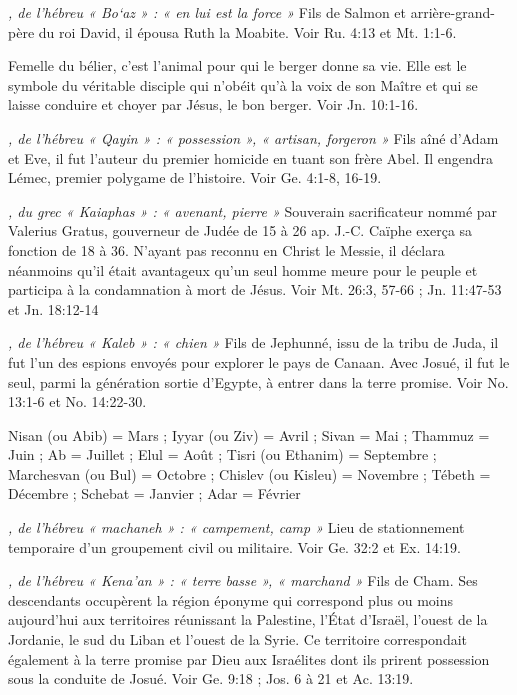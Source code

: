 \begin{multicols}{2}
\textit{, de l'hébreu « Bo`az » : « en lui est la force »}\newline
Fils de Salmon et arrière-grand-père du roi David, il épousa Ruth la Moabite. Voir Ru. 4:13 et Mt. 1:1-6.

\textit{}\newline
Femelle du bélier, c'est l'animal pour qui le berger donne sa vie. Elle est le symbole du véritable disciple qui n'obéit qu'à la voix de son Maître et qui se laisse conduire et choyer par Jésus, le bon berger. Voir Jn. 10:1-16.

\textit{, de l'hébreu « Qayin » : « possession », « artisan, forgeron »}\newline
Fils aîné d'Adam et Eve, il fut l'auteur du premier homicide en tuant son frère Abel. Il engendra Lémec, premier polygame de l'histoire. Voir Ge. 4:1-8, 16-19.

\textit{, du grec « Kaiaphas » : « avenant, pierre »}\newline
Souverain sacrificateur nommé par Valerius Gratus, gouverneur de Judée de 15 à 26 ap. J.-C. Caïphe exerça sa fonction de 18 à 36. N'ayant pas reconnu en Christ le Messie, il déclara néanmoins qu'il était avantageux qu'un seul homme meure pour le peuple et participa à la condamnation à mort de Jésus. Voir Mt. 26:3, 57-66 ; Jn. 11:47-53 et Jn. 18:12-14

\textit{, de l'hébreu « Kaleb » : « chien »}\newline
Fils de Jephunné, issu de la tribu de Juda, il fut l'un des espions envoyés pour explorer le pays de Canaan. Avec Josué, il fut le seul, parmi la génération sortie d'Egypte, à entrer dans la terre promise. Voir No. 13:1-6 et No. 14:22-30.

\textit{}\newline
Nisan (ou Abib) = Mars ; Iyyar (ou Ziv) = Avril ; Sivan = Mai ; Thammuz = Juin ; Ab = Juillet ; Elul = Août ; Tisri (ou Ethanim) = Septembre ; Marchesvan (ou Bul) = Octobre ; Chislev (ou Kisleu) = Novembre ; Tébeth = Décembre ; Schebat = Janvier ; Adar = Février

\textit{, de l'hébreu « machaneh » : « campement, camp »}\newline
Lieu de stationnement temporaire d'un groupement civil ou militaire. Voir Ge. 32:2 et Ex. 14:19.

\textit{, de l'hébreu « Kena'an » : « terre basse », « marchand »}\newline
Fils de Cham. Ses descendants occupèrent la région éponyme qui correspond plus ou moins aujourd'hui aux territoires réunissant la Palestine, l'État d'Israël, l'ouest de la Jordanie, le sud du Liban et l'ouest de la Syrie. Ce territoire correspondait également à la terre promise par Dieu aux Israélites dont ils prirent possession sous la conduite de Josué. Voir Ge. 9:18 ; Jos. 6 à 21 et Ac. 13:19.


\end{multicols}
